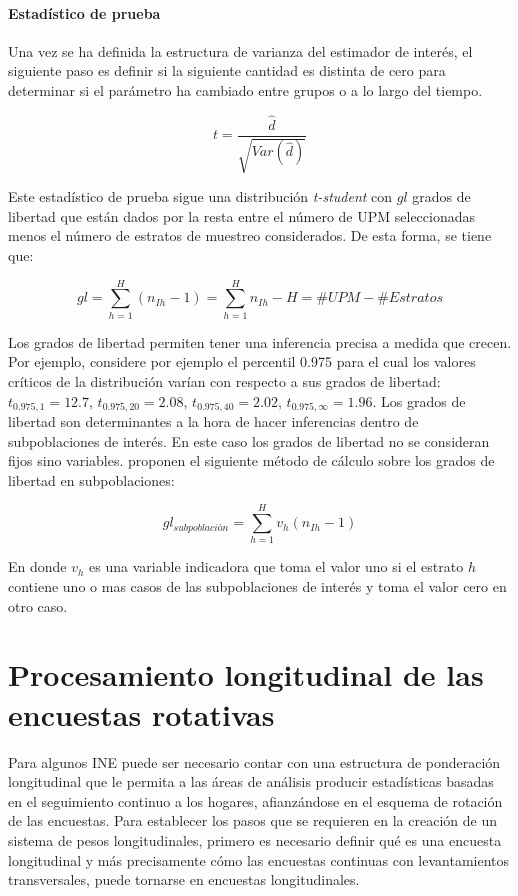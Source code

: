 \documentclass[
  10pt,
  spanish,
]{book}
\begin{document}
\hypertarget{estaduxedstico-de-prueba}{%
\subsubsection*{Estadístico de prueba}\label{estaduxedstico-de-prueba}}

Una vez se ha definida la estructura de varianza del estimador de
interés, el siguiente paso es definir si la siguiente cantidad es
distinta de cero para determinar si el parámetro ha cambiado entre
grupos o a lo largo del tiempo.

\[
t = \frac{\hat{d}}{\sqrt{Var(\hat{d})}}
\]

Este estadístico de prueba sigue una distribución \emph{t-student} con \(gl\)
grados de libertad que están dados por la resta entre el número de UPM
seleccionadas menos el número de estratos de muestreo considerados. De
esta forma, se tiene que:

\[
gl = \sum_{h=1}^H (n_{Ih} - 1) = \sum_{h=1}^H n_{Ih} - H = \#UPM - \#Estratos
\]

Los grados de libertad permiten tener una inferencia precisa a medida
que crecen. Por ejemplo, considere por ejemplo el percentil 0.975 para
el cual los valores críticos de la distribución varían con respecto a
sus grados de libertad: \(t_{0.975, 1}=12.7\), \(t_{0.975, 20}=2.08\),
\(t_{0.975, 40}=2.02\), \(t_{0.975, \infty}=1.96\). Los grados de libertad
son determinantes a la hora de hacer inferencias dentro de
subpoblaciones de interés. En este caso los grados de libertad no se
consideran fijos sino variables. \citet{Korn_Graubard_1999} proponen el
siguiente método de cálculo sobre los grados de libertad en
subpoblaciones:

\[
gl_{subpoblación} = \sum_{h=1}^H v_h(n_{Ih} - 1)
\]

En donde \(v_h\) es una variable indicadora que toma el valor uno si el
estrato \(h\) contiene uno o mas casos de las subpoblaciones de interés y
toma el valor cero en otro caso.

\hypertarget{procesamiento-longitudinal-de-las-encuestas-rotativas}{%
\chapter{Procesamiento longitudinal de las encuestas rotativas}\label{procesamiento-longitudinal-de-las-encuestas-rotativas}}

Para algunos INE puede ser necesario contar con una estructura de ponderación longitudinal que le permita a las áreas de análisis producir estadísticas basadas en el seguimiento continuo a los hogares, afianzándose en el esquema de rotación de las encuestas. Para establecer los pasos que se requieren en la creación de un sistema de pesos longitudinales, primero es necesario definir qué es una encuesta longitudinal y más precisamente cómo las encuestas continuas con levantamientos transversales, puede tornarse en encuestas longitudinales.
\end{document}
